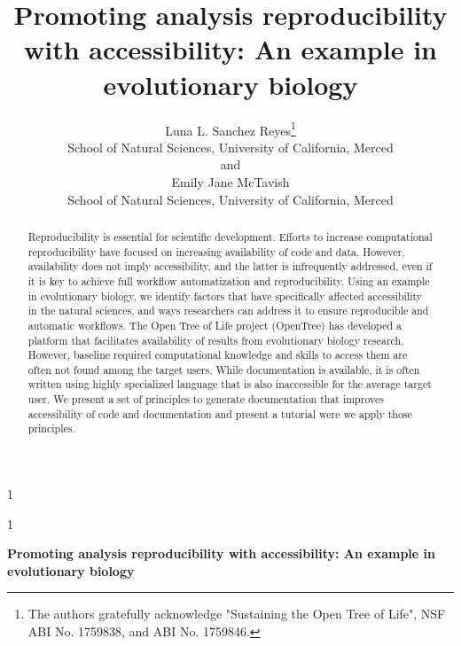 \documentclass[12pt]{article}
\newcommand{\blind}{1}
\begin{document}
%

\def\spacingset#1{\renewcommand{\baselinestretch}%
{#1}\small\normalsize} \spacingset{1}



\blind
{
  \title{\bf Promoting analysis reproducibility with accessibility: An example in evolutionary biology}
  \author{Luna L. Sanchez Reyes\thanks{
    The authors gratefully acknowledge "Sustaining the Open Tree of Life", NSF ABI No. 1759838, and ABI No. 1759846.}\hspace{.2cm}\\
    School of Natural Sciences, University of California, Merced\\
    and \\
    Emily Jane McTavish \\
    School of Natural Sciences, University of California, Merced}
  \maketitle
} \fi

\blind
{
  \bigskip
  \bigskip
  \bigskip
  \begin{center}
    {\LARGE\bf Promoting analysis reproducibility with accessibility: An example in evolutionary biology}
\end{center}
  \medskip
} \fi

\bigskip
\begin{abstract}
Reproducibility is essential for scientific development. Efforts
to increase computational reproducibility have focused on increasing availability
of code and data. However, availability does not imply accessibility, and the latter
is infrequently addressed, even if it is key to achieve full workflow automatization
and reproducibility. Using an example in evolutionary biology, we identify factors that have specifically affected accessibility in
the natural sciences, and ways researchers can address it to ensure reproducible
and automatic workflows.
The Open Tree of Life project (OpenTree) has developed a platform that facilitates
availability of results from evolutionary biology research. However, baseline required
computational knowledge and skills to
access them are often not found among the target users. While documentation
is available, it is often written using highly specialized language that is also inaccessible for the
average target user.
We present a set of principles to generate documentation that improves accessibility
of code and documentation and present a tutorial were we apply those principles.



\end{abstract}
\end{document}
